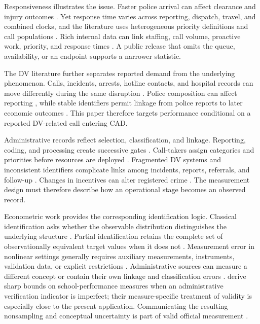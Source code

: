 \documentclass[11pt]{article}
\begin{document}
Responsiveness illustrates the issue. Faster police arrival can affect clearance and injury outcomes \citep{BlanesKirchmaier2018,DeAngeloTogerWeisburd2023}. Yet response time varies across reporting, dispatch, travel, and combined clocks, and the literature uses heterogeneous priority definitions and call populations \citep{VerlaanRuiter2023}. Rich internal data can link staffing, call volume, proactive work, priority, and response times \citep{MourtgosAdamsNix2024}. A public release that omits the queue, availability, or an endpoint supports a narrower statistic.

The DV literature further separates reported demand from the underlying phenomenon. Calls, incidents, arrests, hotline contacts, and hospital records can move differently during the same disruption \citep{LeslieWilson2020,BullingerCarrPackham2021,MillerSegalSpencer2022,MillerSegalSpencer2024}. Police composition can affect reporting \citep{MillerSegal2019}, while stable identifiers permit linkage from police reports to later economic outcomes \citep{AdamsHuttunenNixZhang2024}. This paper therefore targets performance conditional on a reported DV-related call entering CAD.

Administrative records reflect selection, classification, and linkage. Reporting, coding, and processing create successive gates \citep{KlingerBridges1997,BoivinCordeau2011,BoivinOuellet2014,SimpsonOrosco2021,KnoxLoweMummolo2020}. Call-takers assign categories and priorities before resources are deployed \citep{Pandey2025}. Fragmented DV systems and inconsistent identifiers complicate links among incidents, reports, referrals, and follow-up \citep{Phoenix2023,VomfellPovala2023}. Changes in incentives can alter registered crime \citep{AhmedLatifVyborny2026}. The measurement design must therefore describe how an operational stage becomes an observed record.

Econometric work provides the corresponding identification logic. Classical identification asks whether the observable distribution distinguishes the underlying structure \citep{KoopmansReiersol1950,Rothenberg1971,Lewbel2019}. Partial identification retains the complete set of observationally equivalent target values when it does not \citep{Manski1989,Manski1990,Manski2003,Molinari2020}. Measurement error in nonlinear settings generally requires auxiliary measurements, instruments, validation data, or explicit restrictions \citep{ChenHongNekipelov2011}. Administrative sources can measure a different concept or contain their own linkage and classification errors \citep{KapteynYpma2007}. \citet{DominitzSherman2006} derive sharp bounds on school-performance measures when an administrative verification indicator is imperfect; their measure-specific treatment of validity is especially close to the present application. Communicating the resulting nonsampling and conceptual uncertainty is part of valid official measurement \citep{Manski2015}.
\end{document}
